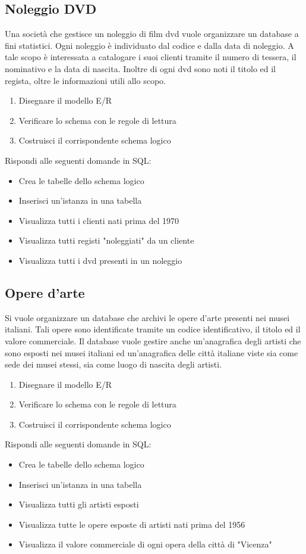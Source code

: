 \documentclass{article}
\begin{document}
	\subsection{Noleggio DVD}
	Una società che gestisce un noleggio di film dvd vuole organizzare un database a fini statistici. Ogni noleggio è individuato dal codice e dalla data di noleggio. A tale scopo è interessata a catalogare i suoi clienti tramite il numero di tessera, il nominativo e la data di nascita. Inoltre di ogni dvd sono noti il titolo ed il regista, oltre le informazioni utili allo scopo.
	\begin{enumerate}
		\item Disegnare il modello E/R
		\item Verificare lo schema con le regole di lettura
		\item Costruisci il corrispondente schema logico
	\end{enumerate}
	Rispondi alle seguenti domande in SQL:
	\begin{itemize}
		\item Crea le tabelle dello schema logico
		\item Inserisci un'istanza in una tabella
		\item Visualizza tutti i clienti nati prima del 1970
		\item Visualizza tutti registi "noleggiati" da un cliente
		\item Visualizza tutti i dvd presenti in un noleggio
	\end{itemize}

	\subsection{Opere d'arte}
	Si vuole organizzare un database che archivi le opere d’arte presenti nei musei italiani. Tali opere sono identificate tramite un codice identificativo, il titolo ed il valore commerciale. Il database vuole gestire anche un’anagrafica degli artisti che sono esposti nei musei italiani ed un’anagrafica delle città italiane viste sia come sede dei musei stessi, sia come luogo di nascita degli artisti.
	\begin{enumerate}
		\item Disegnare il modello E/R
		\item Verificare lo schema con le regole di lettura
		\item Costruisci il corrispondente schema logico
	\end{enumerate}
	Rispondi alle seguenti domande in SQL:
	\begin{itemize}
		\item Crea le tabelle dello schema logico
		\item Inserisci un'istanza in una tabella
		\item Visualizza tutti gli artisti esposti
		\item Visualizza tutte le opere esposte di artisti nati prima del 1956
		\item Visualizza il valore commerciale di ogni opera della città di "Vicenza"
	\end{itemize}
\end{document}
